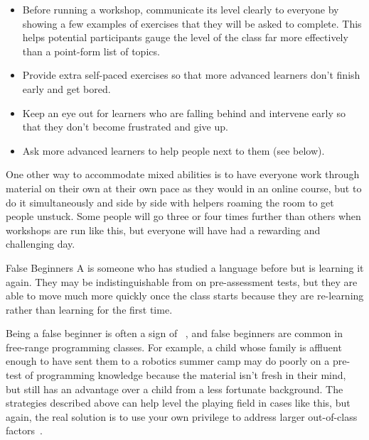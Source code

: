 \begin{itemize}

\item
  Before running a workshop,
  communicate its level clearly to everyone
  by showing a few examples of exercises that they will be asked to complete.
  This helps potential participants gauge the level of the class
  far more effectively than a point-form list of topics.

\item
  Provide extra self-paced exercises
  so that more advanced learners don't finish early and get bored.

\item
  Keep an eye out for learners who are falling behind
  and intervene early so that they don't become frustrated and give up.

\item
  Ask more advanced learners to help people next to them
  (see  below).

\end{itemize}

One other way to accommodate mixed abilities is
to have everyone work through material on their own at their own pace
as they would in an online course,
but to do it simultaneously and side by side
with helpers roaming the room to get people unstuck.
Some people will go three or four times further than others when workshops are run like this,
but everyone will have had a rewarding and challenging day.

\begin{aside}{False Beginners}
  A  is someone
  who has studied a language before but is learning it again.
  They may be indistinguishable from 
  on pre-assessment tests,
  but they are able to move much more quickly once the class starts
  because they are re-learning rather than learning for the first time.

  Being a false beginner is often a sign of ~\cite{Marg2010},
  and false beginners are common in free-range programming classes.
  For example,
  a child whose family is affluent enough to have sent them to a robotics summer camp
  may do poorly on a pre-test of programming knowledge
  because the material isn't fresh in their mind,
  but still has an advantage over a child from a less fortunate background.
  The strategies described above can help level the playing field in cases like this,
  but again,
  the real solution is to use your own privilege
  to address larger out-of-class factors~\cite{Part2011}.
\end{aside}

